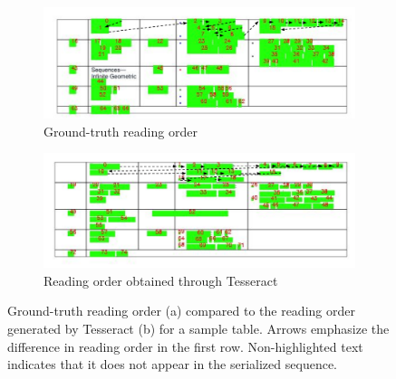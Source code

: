 \begin{figure}
    \centering
    \small
      \begin{subfigure}[b]{\textwidth}
        \includegraphics[width=\textwidth]{images/chapter4/gold_tables_with_ro.pdf}
        \caption{Ground-truth reading order}
      \end{subfigure}
      \begin{subfigure}[b]{\textwidth}
        \includegraphics[width=\textwidth]{images/chapter4/tesseract_tables_with_ro.pdf}
        \caption{Reading order obtained through Tesseract}
      \end{subfigure}
    \caption{Ground-truth reading order (a) compared to the reading order generated by Tesseract (b) for a sample table. Arrows emphasize the difference in reading order in the first row. Non-highlighted text indicates that it does not appear in the serialized sequence.}
    \label{fig:reading-orders-table}
\end{figure}

